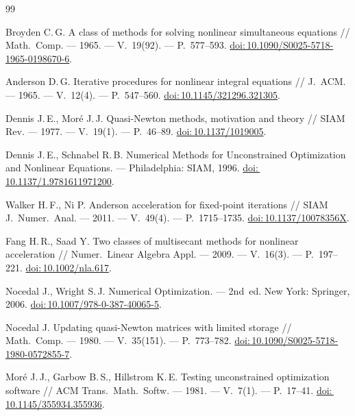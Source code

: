 {}
\begin{thebibliography}{99}

  Broyden C.\,G. A class of methods for solving nonlinear simultaneous equations //
  Math.~Comp. --- 1965. --- V.~19(92). --- P.~577--593.
  \href{https://doi.org/10.1090/S0025-5718-1965-0198670-6}{doi:\,10.1090/S0025-5718-1965-0198670-6}.

  Anderson D.\,G. Iterative procedures for nonlinear integral equations //
  J.~ACM. --- 1965. --- V.~12(4). --- P.~547--560.
  \href{https://doi.org/10.1145/321296.321305}{doi:\,10.1145/321296.321305}.

  Dennis J.\,E., Mor{\'e} J.\,J. Quasi-Newton methods, motivation and theory //
  SIAM Rev. --- 1977. --- V.~19(1). --- P.~46--89.
  \href{https://doi.org/10.1137/1019005}{doi:\,10.1137/1019005}.

  Dennis J.\,E., Schnabel R.\,B. Numerical Methods for Unconstrained Optimization
  and Nonlinear Equations. --- Philadelphia: SIAM, 1996.
  \href{https://doi.org/10.1137/1.9781611971200}{doi:\,10.1137/1.9781611971200}.

  Walker H.\,F., Ni P. Anderson acceleration for fixed-point iterations //
  SIAM J.~Numer.~Anal. --- 2011. --- V.~49(4). --- P.~1715--1735.
  \href{https://doi.org/10.1137/10078356X}{doi:\,10.1137/10078356X}.

  Fang H.\,R., Saad Y. Two classes of multisecant methods for nonlinear acceleration //
  Numer.~Linear Algebra Appl. --- 2009. --- V.~16(3). --- P.~197--221.
  \href{https://doi.org/10.1002/nla.617}{doi:\,10.1002/nla.617}.

  Nocedal J., Wright S.\,J. Numerical Optimization. --- 2nd~ed. New York: Springer, 2006.
  \href{https://doi.org/10.1007/978-0-387-40065-5}{doi:\,10.1007/978-0-387-40065-5}.

  Nocedal J. Updating quasi-Newton matrices with limited storage //
  Math.~Comp. --- 1980. --- V.~35(151). --- P.~773--782.
  \href{https://doi.org/10.1090/S0025-5718-1980-0572855-7}{doi:\,10.1090/S0025-5718-1980-0572855-7}.

  Mor{\'e} J.\,J., Garbow B.\,S., Hillstrom K.\,E. Testing unconstrained optimization software //
  ACM Trans.~Math.~Softw. --- 1981. --- V.~7(1). --- P.~17--41.
  \href{https://doi.org/10.1145/355934.355936}{doi:\,10.1145/355934.355936}.


\end{thebibliography}
